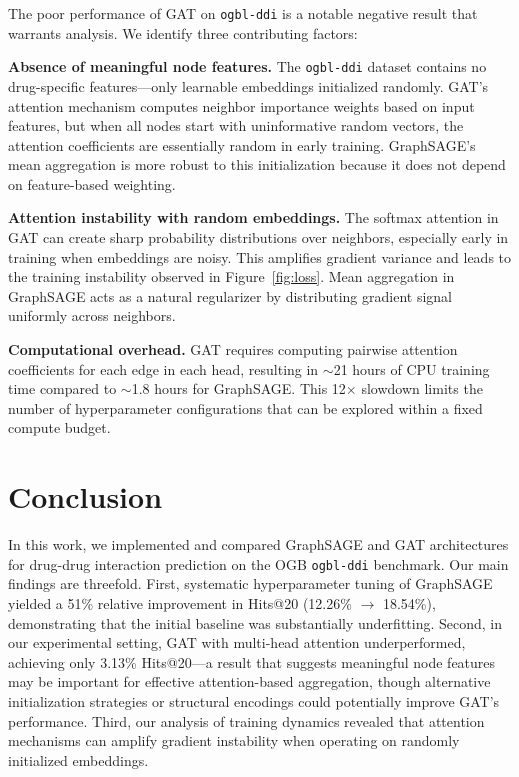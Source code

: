 \documentclass{article}
\begin{document}
The poor performance of GAT on \texttt{ogbl-ddi} is a notable negative result that warrants analysis. We identify three contributing factors:

\textbf{Absence of meaningful node features.} The \texttt{ogbl-ddi} dataset contains no drug-specific features---only learnable embeddings initialized randomly. GAT's attention mechanism computes neighbor importance weights based on input features, but when all nodes start with uninformative random vectors, the attention coefficients are essentially random in early training. GraphSAGE's mean aggregation is more robust to this initialization because it does not depend on feature-based weighting.

\textbf{Attention instability with random embeddings.} The softmax attention in GAT can create sharp probability distributions over neighbors, especially early in training when embeddings are noisy. This amplifies gradient variance and leads to the training instability observed in Figure~\ref{fig:loss}. Mean aggregation in GraphSAGE acts as a natural regularizer by distributing gradient signal uniformly across neighbors.

\textbf{Computational overhead.} GAT requires computing pairwise attention coefficients for each edge in each head, resulting in $\sim$21 hours of CPU training time compared to $\sim$1.8 hours for GraphSAGE. This 12$\times$ slowdown limits the number of hyperparameter configurations that can be explored within a fixed compute budget.


\section{Conclusion}

In this work, we implemented and compared GraphSAGE and GAT architectures for drug-drug interaction prediction on the OGB \texttt{ogbl-ddi} benchmark. Our main findings are threefold. First, systematic hyperparameter tuning of GraphSAGE yielded a 51\% relative improvement in Hits@20 (12.26\% $\rightarrow$ 18.54\%), demonstrating that the initial baseline was substantially underfitting. Second, in our experimental setting, GAT with multi-head attention underperformed, achieving only 3.13\% Hits@20---a result that suggests meaningful node features may be important for effective attention-based aggregation, though alternative initialization strategies or structural encodings could potentially improve GAT's performance. Third, our analysis of training dynamics revealed that attention mechanisms can amplify gradient instability when operating on randomly initialized embeddings.
\end{document}
